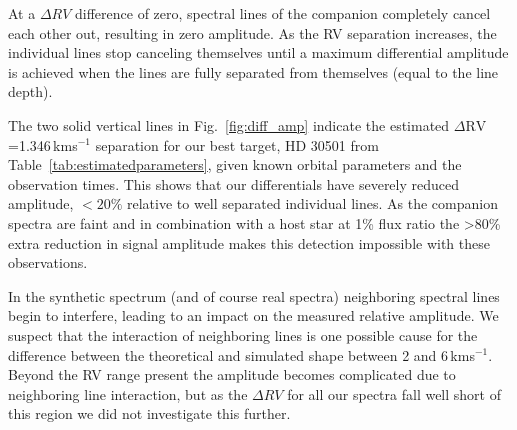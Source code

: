 \documentclass[fleqn,usenatbib]{mnras}
\newcommand{\kmps}{\,kms\(^{-1}\)}	%
\begin{document}
    At a \(\Delta RV\) difference of zero, spectral lines of the companion completely cancel each other out, resulting in zero amplitude. As the RV separation increases, the individual lines stop canceling themselves until a maximum differential amplitude is achieved when the lines are fully separated from themselves (equal to the line depth). 
    
    The two solid vertical lines in Fig.~\ref{fig:diff_amp} indicate the estimated \(\Delta \textrm{RV}\)=1.346\kmps{} separation for our best target, {HD 30501} from Table~\ref{tab:estimatedparameters}, given known orbital parameters and the observation times. This shows that our differentials have severely reduced amplitude, \(<20\%\) relative to well separated individual lines. As the companion spectra are faint and in combination with a host star at 1\% flux ratio the >80\% extra reduction in signal amplitude makes this detection impossible with these observations.
    
    In the synthetic spectrum (and of course real spectra) neighboring spectral lines begin to interfere, leading to an impact on the measured relative amplitude. We suspect that the interaction of neighboring lines is one possible cause for the difference between the theoretical and simulated shape between 2 and 6\kmps{}. Beyond the RV range present the amplitude becomes complicated due to neighboring line interaction, but as the \(\Delta RV\) for all our spectra fall well short of this region we did not investigate this further.
    
\end{document}

